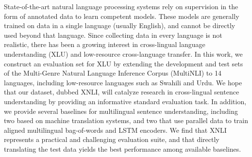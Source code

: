 State-of-the-art natural language processing systems rely on supervision in the form of annotated data to learn competent models. These models are generally trained on data in a single language (usually English), and cannot be directly used beyond that language. Since collecting data in every language is not realistic, there has been a growing interest in cross-lingual language understanding (XLU) and low-resource cross-language transfer. In this work, we construct an evaluation set for XLU by extending the development and test sets of the Multi-Genre Natural Language Inference Corpus (MultiNLI) to 14 languages, including low-resource languages such as Swahili and Urdu. We hope that our dataset, dubbed XNLI, will catalyze research in cross-lingual sentence understanding by providing an informative standard evaluation task. In addition, we provide several baselines for multilingual sentence understanding, including two based on machine translation systems, and two that use parallel data to train aligned multilingual bag-of-words and LSTM encoders. We find that XNLI represents a practical and challenging evaluation suite, and that directly translating the test data yields the best performance among available baselines.
